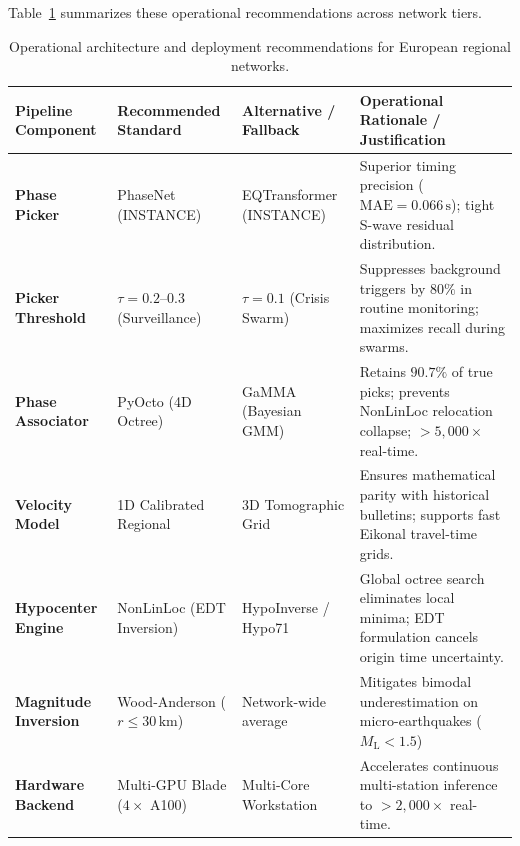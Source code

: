 Table~\ref{tab:recommendations_matrix} summarizes these operational
recommendations across network tiers.
\begin{landscape}
  \begin{table}[htbp]
    \centering
    \small
    \caption{Operational architecture and deployment recommendations for
    European regional networks.}
    \label{tab:recommendations_matrix}
    \begin{threeparttable}
      \begin{tabularx}{\linewidth}{l l l X}
        \toprule
        \textbf{Pipeline Component} & \textbf{Recommended Standard} &
        \textbf{Alternative / Fallback} & \textbf{Operational
        Rationale / Justification} \\
        \midrule
        \textbf{Phase Picker} & PhaseNet (INSTANCE) & EQTransformer
        (INSTANCE) & Superior timing precision ($\mathrm{MAE} =
        0.066\,\unit{\second}$); tight S-wave residual distribution. \\
        \textbf{Picker Threshold} & $\tau = 0.2\text{--}0.3$
        (Surveillance) & $\tau = 0.1$ (Crisis Swarm) & Suppresses
        background triggers by $80\%$ in routine monitoring; maximizes
        recall during swarms. \\
        \textbf{Phase Associator} & PyOcto (4D Octree) & GaMMA
        (Bayesian GMM) & Retains $90.7\%$ of true picks; prevents
        NonLinLoc relocation collapse; $>5{,}000 \times$ real-time. \\
        \textbf{Velocity Model} & 1D Calibrated Regional & 3D
        Tomographic Grid & Ensures mathematical parity with historical
        bulletins; supports fast Eikonal travel-time grids. \\
        \textbf{Hypocenter Engine} & NonLinLoc (EDT Inversion) &
        HypoInverse / Hypo71 & Global octree search eliminates local
        minima; EDT formulation cancels origin time uncertainty. \\
        \textbf{Magnitude Inversion} & Wood-Anderson ($r \le
        30\,\unit{\kilo\meter}$) & Network-wide average & Mitigates
        bimodal underestimation on micro-earthquakes ($M_{\mathrm{L}} < 1.5$)\\
        \textbf{Hardware Backend} & Multi-GPU Blade ($4 \times$ A100) &
        Multi-Core Workstation & Accelerates continuous multi-station
        inference to $>2{,}000 \times$ real-time. \\
        \bottomrule
      \end{tabularx}
      \begin{tablenotes}[flushleft]

\end{tablenotes}
\end{threeparttable}
\end{table}
\end{landscape}
